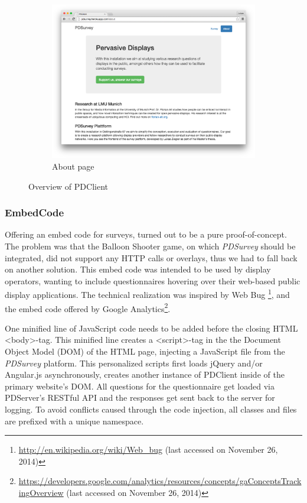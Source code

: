 \begin{figure}
		    \begin{subfigure}[b]{0.6\textwidth}
		        \centering
		        \includegraphics[width=\textwidth]{img/screenshots/pdclient/about}
		        \caption{About page}
		        \label{fig:4-pdclient-about}
		    \end{subfigure}
		    \caption{Overview of PDClient}
		    \label{fig:pdclient-screenshots}
		\end{figure}



	\subsubsection{EmbedCode}

		Offering an embed code for surveys, turned out to be a pure proof-of-concept. The problem was that the Balloon Shooter game, on which \textit{PDSurvey} should be integrated, did not support any HTTP calls or overlays, thus we had to fall back on another solution. This embed code was intended to be used by display operators, wanting to include questionnaires hovering over their web-based public display applications. The technical realization was inspired by Web Bug \footnote{\url{http://en.wikipedia.org/wiki/Web_bug} (last accessed on November 26, 2014)}, and the embed code offered by Google Analytics\footnote{\url{https://developers.google.com/analytics/resources/concepts/gaConceptsTrackingOverview} (last accessed on November 26, 2014)}.

		One minified line of JavaScript code needs to be added before the closing HTML <body>-tag. This minified line creates a <script>-tag in the the Document Object Model (DOM) of the HTML page, injecting a JavaScript file from the \textit{PDSurvey} platform. This personalized scripts first loads jQuery and/or Angular.js asynchronously, creates another instance of PDClient inside of the primary website's DOM. All questions for the questionnaire get loaded via PDServer's RESTful API and the responses get sent back to the server for logging. To avoid conflicts caused through the code injection, all classes and files are prefixed with a unique namespace.





